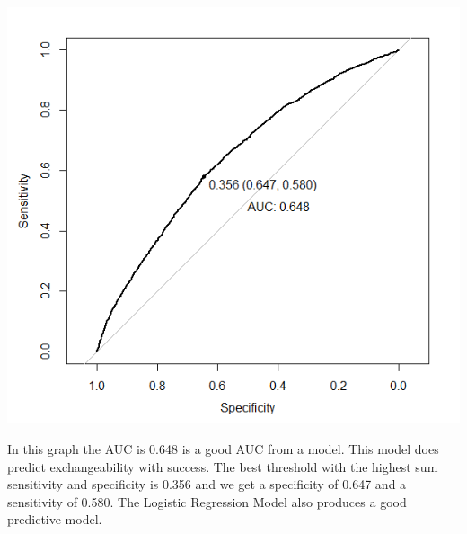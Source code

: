 \documentclass[
]{article}
\begin{document}
\includegraphics{images/Exchange QS/Logistic/LRPredictiveBestRoc.png}

In this graph the AUC is 0.648 is a good AUC from a model. This model
does predict exchangeability with success. The best threshold with the
highest sum sensitivity and specificity is 0.356 and we get a
specificity of 0.647 and a sensitivity of 0.580. The Logistic Regression
Model also produces a good predictive model.
\end{document}
